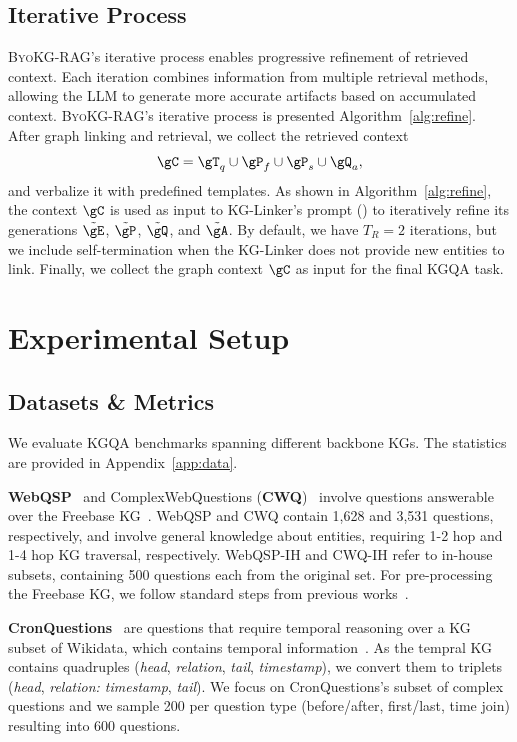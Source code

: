 \documentclass[11pt]{article}
\newcommand{\byokg}{\textsc{ByoKG-RAG}\xspace}
\newcommand{\glink}{KG-Linker\xspace}
\begin{document}
\subsection{Iterative Process}
\label{sec:refine}
\byokg's iterative process enables progressive refinement of retrieved context. Each iteration combines information from multiple retrieval methods, allowing the LLM to generate more accurate artifacts based on accumulated context.
\byokg's iterative process is presented Algorithm~\ref{alg:refine}.  After graph linking and retrieval, we collect the retrieved context 
\begin{equation}
    \gC = \gT_q \cup \gP_f \cup \gP_s \cup \gQ_a,
\end{equation}
and verbalize it with predefined templates. As shown in Algorithm~\ref{alg:refine}, the context $\gC$ is used as input to \glink's prompt () to iteratively refine its generations $\tilde{\gE}$, $ \tilde{\gP}$, $\tilde{\gQ}$, and $\tilde{\gA}$.  
By default, we have $T_R = 2$ iterations, but we include self-termination when the \glink does not provide new entities to link. Finally, we collect the graph context $\gC$ as input for the final KGQA task.



\section{Experimental Setup}

\subsection{Datasets \& Metrics} 

We evaluate KGQA benchmarks spanning different backbone KGs. The statistics are provided in Appendix~\ref{app:data}.

\textbf{WebQSP}~\citep{yih2015semantic} and ComplexWebQuestions (\textbf{CWQ})~\citep{talmor2018web} involve questions answerable over the Freebase KG~\citep{bollacker2008freebase}. WebQSP and CWQ contain 1,628 and 3,531 questions, respectively, and involve general knowledge about entities, requiring 1-2 hop and 1-4 hop KG traversal, respectively. WebQSP-IH and CWQ-IH refer to in-house subsets, containing 500 questions each from the original set. For pre-processing the Freebase KG, we follow standard steps from previous works~\citep{he2021improving}.



\textbf{CronQuestions}~\citep{saxena2021question} are questions that require temporal reasoning over a KG subset of Wikidata, which contains temporal information~\citep{lacroix2020tensor}. As the tempral KG contains quadruples (\textit{head}, \textit{relation}, \textit{tail}, 
 \textit{timestamp}), we convert them to triplets (\textit{head}, \textit{relation: timestamp}, \textit{tail}).  We focus on CronQuestions's subset of complex questions and we sample 200 per question type (before/after, first/last, time join) resulting into 600 questions. 
\end{document}
